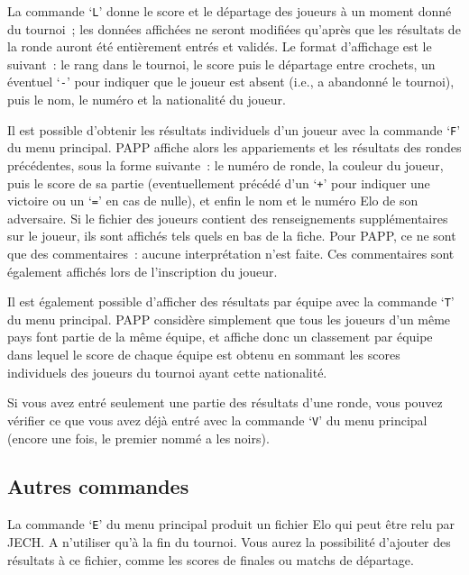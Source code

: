 \documentclass[10pt]{article}
\begin{document}
	La commande `\verb|L|' donne le score et le d\'epartage des
joueurs \`a un moment donn\'e du tournoi~; les donn\'ees affich\'ees ne
seront modifi\'ees qu'apr\`es que les r\'esultats de la ronde auront
\'et\'e enti\`erement entr\'es et valid\'es.  Le format d'affichage est
le suivant~: le rang dans le tournoi, le score puis le d\'epartage entre
crochets, un \'eventuel `\verb|-|' pour indiquer que le joueur est
absent (i.e., a abandonn\'e le tournoi), puis le nom, le num\'ero et la
nationalit\'e du joueur.

Il est possible d'obtenir les r\'esultats individuels d'un joueur avec 
la commande `\verb|F|' du menu principal.  PAPP affiche alors les 
appariements et les r\'esultats des rondes pr\'ec\'edentes, sous la 
forme suivante~: le num\'ero de ronde, la couleur du joueur, puis le 
score de sa partie (eventuellement pr\'ec\'ed\'e d'un `\verb|+|' pour 
indiquer une victoire ou un `\verb|=|' en cas de nulle), et enfin le 
nom et le num\'ero Elo de son adversaire.  Si le fichier des joueurs 
contient des renseignements suppl\'ementaires sur le joueur, ils sont 
affich\'es tels quels en bas de la fiche.  Pour PAPP, ce ne sont que 
des commentaires~: aucune interpr\'etation n'est faite.  Ces 
commentaires sont \'egalement affich\'es lors de l'inscription du 
joueur.

Il est \'egalement possible d'afficher des r\'esultats par \'equipe 
avec la commande `\verb|T|' du menu principal.  PAPP consid\`ere 
simplement que tous les joueurs d'un m\^eme pays font partie de la 
m\^eme \'equipe, et affiche donc un classement par \'equipe dans 
lequel le score de chaque \'equipe est obtenu en sommant les scores 
individuels des joueurs du tournoi ayant cette nationalit\'e.

	Si vous avez entr\'e seulement une partie des r\'esultats d'une
ronde, vous pouvez v\'erifier ce que vous avez d\'ej\`a entr\'e avec la
commande `\verb|V|' du menu principal (encore une fois, le premier nomm\'e
a les noirs).

\subsection{Autres commandes}


La commande `\verb|E|' du menu principal produit un fichier Elo qui 
peut \^etre relu par JECH. A n'utiliser qu'\`a la fin du tournoi. Vous aurez la possibilit\'e
d'ajouter des r\'esultats \`a ce fichier, comme les scores de finales ou matchs de d\'epartage.
\end{document}
